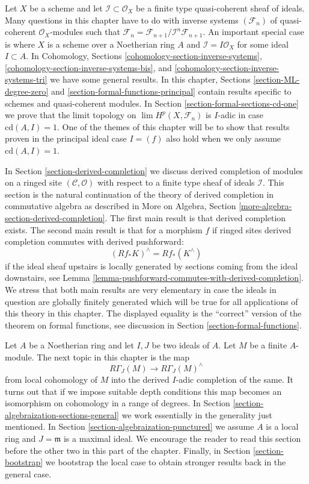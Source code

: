 \medskip\noindent
Let $X$ be a scheme and let $\mathcal{I} \subset \mathcal{O}_X$
be a finite type quasi-coherent sheaf of ideals. Many questions
in this chapter have to do with inverse systems $(\mathcal{F}_n)$
of quasi-coherent $\mathcal{O}_X$-modules such that
$\mathcal{F}_n = \mathcal{F}_{n + 1}/\mathcal{I}^n\mathcal{F}_{n + 1}$.
An important special case is where $X$ is a scheme over a Noetherian
ring $A$ and $\mathcal{I} = I \mathcal{O}_X$ for some ideal $I \subset A$.
In Cohomology, Sections \ref{cohomology-section-inverse-systems},
\ref{cohomology-section-inverse-systems-bis}, and
\ref{cohomology-section-inverse-systems-tri} we have some general
results. In this chapter, Sections \ref{section-ML-degree-zero} and
\ref{section-formal-functions-principal} contain results specific
to schemes and quasi-coherent modules. In
Section \ref{section-formal-sections-cd-one} we prove
that the limit topology on $\lim H^p(X, \mathcal{F}_n)$ is $I$-adic
in case $\text{cd}(A, I) = 1$. One of the themes
of this chapter will be to show that results proven in the
principal ideal case $I = (f)$
also hold when we only assume $\text{cd}(A, I) = 1$.

\medskip\noindent
In Section \ref{section-derived-completion} we discuss derived completion
of modules on a ringed site $(\mathcal{C}, \mathcal{O})$
with respect to a finite type sheaf of ideals $\mathcal{I}$.
This section is the natural continuation of the theory of derived completion
in commutative algebra as described in
More on Algebra, Section \ref{more-algebra-section-derived-completion}.
The first main result is that derived completion exists.
The second main result is that for a morphism $f$ if ringed sites
derived completion commutes with derived pushforward:
$$
(Rf_*K)^\wedge = Rf_*(K^\wedge)
$$
if the ideal sheaf upstairs is locally generated by sections coming
from the ideal downstairs, see
Lemma \ref{lemma-pushforward-commutes-with-derived-completion}.
We stress that both main results are very elementary in case the
ideals in question are globally finitely generated which will
be true for all applications of this theory in this chapter.
The displayed equality is the ``correct'' version of the
theorem on formal functions, see discussion in
Section \ref{section-formal-functions}.

\medskip\noindent
Let $A$ be a Noetherian ring and let $I, J$ be two ideals of $A$.
Let $M$ be a finite $A$-module.
The next topic in this chapter is the map
$$
R\Gamma_J(M) \longrightarrow R\Gamma_J(M)^\wedge
$$
from local cohomology of $M$ into the derived $I$-adic completion
of the same. It turns out that if we impose suitable depth conditions
this map becomes an isomorphism on cohomology in a range of degrees.
In Section \ref{section-algebraization-sections-general}
we work essentially in the generality just mentioned.
In Section \ref{section-algebraization-punctured}
we assume $A$ is a local ring and $J = \mathfrak m$ is a maximal ideal.
We encourage the reader to read this section before the other two in
this part of the chapter.
Finally, in Section \ref{section-bootstrap} we bootstrap
the local case to obtain stronger results back in the general case.

